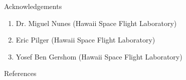 \documentclass{beamer}
\newlength{\onecolwid}
\begin{document}
\begin{frame}[t]
\begin{columns}[t]
\begin{column}{\onecolwid}
				\begin{block}{Acknowledgements}
					\begin{enumerate}
						\item Dr. Miguel Nunes (Hawaii Space Flight Laboratory)
						\item Eric Pilger (Hawaii Space Flight Laboratory)
						\item Yosef Ben Gershom (Hawaii Space Flight Laboratory)
					\end{enumerate}
				\end{block}
				
				\begin{block}{References}
					\nocite{perryman:hipparcosCatalogue}
					\nocite{bratt:analysisStarIdentification}
					\nocite{coleAndCrassidis:planarTriangleMethod}
					\nocite{coleAndCrassidis:sphericalTriangleMethod}
					\nocite{gottlieb:spacecraftAttitudeDetermination}
					\nocite{spratling:surveyStarIdentification}
					\nocite{liebe:starTrackersAttitudeDetermination}
					\nocite{toloei:compositeIdentification}
					\nocite{tappe:starTrackerDevelopment}
					\nocite{mortari:pyramidIdentification}
					
					\parbox{0.95\linewidth}{\scriptsize
						
					}
				\end{block}

			\end{column}
		\end{columns}				
	\end{frame}
\end{document}
